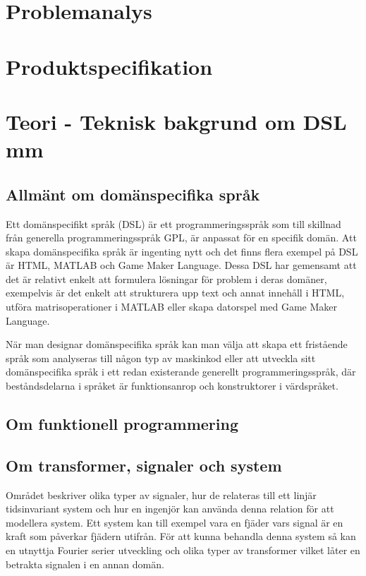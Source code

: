 \documentclass[]{article}
\begin{document}
\section{Problemanalys}

\section{Produktspecifikation}

\section{Teori - Teknisk bakgrund om DSL mm}

\subsection{Allmänt om domänspecifika språk}
Ett domänspecifikt språk (\gls{DSL}) är ett programmeringsspråk som till
skillnad från generella programmeringsspråk \gls{GPL}, är anpassat för en specifik domän.
Att skapa domänspecifika språk är ingenting nytt och det finns flera exempel på
DSL är HTML, MATLAB och Game Maker Language.
Dessa DSL har gemensamt att det är relativt enkelt att formulera lösningar för
problem i deras domäner, exempelvis är det enkelt att strukturera upp text och
annat innehåll i HTML, utföra matrisoperationer i MATLAB eller skapa datorspel
med Game Maker Language.

När man designar domänspecifika språk kan man välja att skapa ett fristående
språk som analyseras till någon typ av maskinkod eller att utveckla sitt
domänspecifika språk i ett redan existerande generellt programmeringsspråk,
där beståndsdelarna i språket är funktionsanrop och konstruktorer i värdspråket.

\subsection{Om funktionell programmering}

\subsection{Om transformer, signaler och system}
Området beskriver olika typer av signaler, hur de relateras till ett
linjär tidsinvariant system och hur en ingenjör kan använda denna relation
för att modellera system. Ett system kan till exempel vara en fjäder vars
signal är en kraft som påverkar fjädern utifrån.
För att kunna behandla denna system så kan en utnyttja Fourier serier
utveckling och olika typer av transformer vilket låter en betrakta signalen
i en annan domän.
\end{document}
